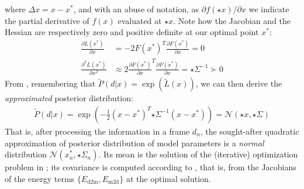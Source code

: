 %
where $\Delta x=x - x^*$, and with an abuse of notation, as $\partial f(\star{x})/\partial x$ we indicate the partial derivative of $f(x)$ evaluated at $\star{x}$. Note how the Jacobian and the Hessian are respectively zero and positive definite at our optimal point $x^*$:
%
\begin{align}
\tfrac{\partial L(x^*)}{\partial x} &= - 2 F(x^*)^T 
\tfrac{\partial F(x^*)}{\partial x} = 0 
\label{eq:taylor-jacobian}
\\
\tfrac{\partial^2 L(x^*)}{\partial x^2} 
& \approx 2 \tfrac{\partial F(x^*)}{\partial x}^T \tfrac{\partial F(x^*)}{\partial x}
= {\star{\Sigma}}^{-1} \succ 0
\label{eq:taylor-hessian}
\end{align}
% 
From , remembering that $\tilde P(d|x) = \exp (\tilde{L}(x))$, we can then derive the \emph{approximated} posterior distribution:
%
\begin{align}
\tilde{P}(d|x) = \exp\left(- \tfrac{1}{2}(x - x^*)^T {\star{\Sigma}}^{-1}  (x - x^*) \right) = \mathcal{N}\left(\star{x}, \star{\Sigma} \right)
\end{align}
%
That is, after processing the information in a frame $d_n$, the sought-after quadratic approximation of posterior distribution of model parameters is a \emph{normal} distribution $\mathcal{N}\left(x_n^*, \star\Sigma_n \right)$.
Its mean is the solution of the (iterative) optimization problem in ; its covariance is computed according to , that is, from the Jacobians of the energy terms $\{E_{\text{d2m}}, E_{\text{m2d}}\}$ at the optimal solution.



